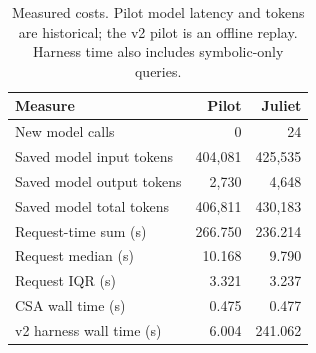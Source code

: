 \begin{table}[t]
\caption{Measured costs. Pilot model latency and tokens are historical; the v2 pilot is an offline replay. Harness time also includes symbolic-only queries.}
\label{tab:costs}
\centering\small
\begin{tabular}{lrr}\toprule
Measure & Pilot & Juliet\\\midrule
New model calls & 0 & 24\\
Saved model input tokens & 404,081 & 425,535\\
Saved model output tokens & 2,730 & 4,648\\
Saved model total tokens & 406,811 & 430,183\\
Request-time sum (s) & 266.750 & 236.214\\
Request median (s) & 10.168 & 9.790\\
Request IQR (s) & 3.321 & 3.237\\
CSA wall time (s) & 0.475 & 0.477\\
v2 harness wall time (s) & 6.004 & 241.062\\
\bottomrule\end{tabular}
\end{table}
